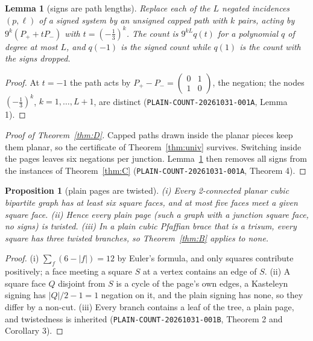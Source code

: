 \documentclass[11pt]{article}
\newtheorem{lemma}[theorem]{Lemma}
\newtheorem{proposition}[theorem]{Proposition}
\theoremstyle{definition}
\theoremstyle{remark}
\begin{document}
\begin{lemma}[signs are path lengths]\label{lem:long}
Replace each of the $L$ negated incidences $(p,\ell)$ of a signed system by
an unsigned capped path with $k$ pairs, acting by $9^k(P_++tP_-)$ with
$t=(-\tfrac13)^k$. The count is $9^{kL}q(t)$ for a polynomial $q$ of degree at
most $L$, and $q(-1)$ is the signed count while $q(1)$ is the count with the
signs dropped.
\end{lemma}
\begin{proof}
At $t=-1$ the path acts by $P_+-P_-=\begin{pmatrix}0&1\\1&0\end{pmatrix}$, the
negation; the nodes $(-\tfrac13)^k$, $k=1,\dots,L+1$, are distinct
(\texttt{PLAIN-COUNT-20261031-001A}, Lemma 1).
\end{proof}

\begin{proof}[Proof of Theorem~\ref{thm:D}]
Capped paths drawn inside the planar pieces keep them planar, so the
certificate of Theorem~\ref{thm:univ} survives. Switching inside the pages
leaves six negations per junction. Lemma~\ref{lem:long} then removes all
signs from the instances of Theorem~\ref{thm:C}
(\texttt{PLAIN-COUNT-20261031-001A}, Theorem 4).
\end{proof}

\begin{proposition}[plain pages are twisted]\label{prop:pages}
(i) Every 2-connected planar cubic bipartite graph has at least six square
faces, and at most five faces meet a given square face. (ii) Hence every
\emph{plain page} (such a graph with a junction square face, no signs) is
twisted. (iii) In a plain cubic Pfaffian brace that is a trisum, every square
has three twisted branches, so Theorem~\ref{thm:B} applies to none.
\end{proposition}
\begin{proof}
(i) $\sum_f(6-|f|)=12$ by Euler's formula, and only squares contribute
positively; a face meeting a square $S$ at a vertex contains an edge of $S$.
(ii) A square face $Q$ disjoint from $S$ is a cycle of the page's own edges, a
Kasteleyn signing has $|Q|/2-1=1$ negation on it, and the plain signing has
none, so they differ by a non-cut. (iii) Every branch contains a leaf of the
tree, a plain page, and twistedness is inherited
(\texttt{PLAIN-COUNT-20261031-001B}, Theorem 2 and Corollary 3).
\end{proof}
\end{document}
